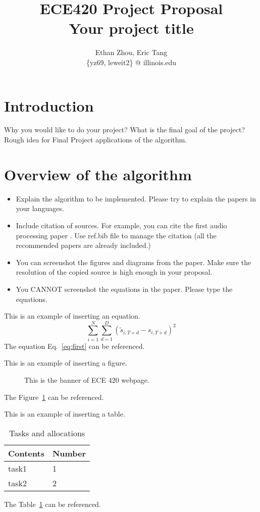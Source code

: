 \documentclass[journal,onecolumn, draftclsnofoot, 12pt]{IEEEtran}
\title{ECE420 Project Proposal\\ Your project title }
\author{Ethan Zhou, Eric Tang \\
\{yz69, leweit2\} @ illinois.edu}
\begin{document}
\maketitle
\section{Introduction}
Why you would like to do your project? What is the final goal of the project? Rough idea for Final Project applications of the algorithm.

\section{Overview of the algorithm}
\begin{itemize}
    \item Explain the algorithm to be implemented. Please try to explain the papers in your languages.
    \item Include citation of sources. For example, you can cite the first audio processing paper \cite{wang2003industrial}. Use ref.bib file to manage the citation (all the recommended papers are already included.)  
    \item You can screenshot the figures and diagrams from the paper. Make sure the resolution of the copied source is high enough in your proposal.
    \item You CANNOT screenshot the equations in the paper. Please type the equations. 
\end{itemize}


This is an example of inserting an equation. 
\begin{equation} \label{eq:first}
    \sum_{i=1}^N  \sum_{d=1}^D (\widetilde{s}_{i, T+d} - {s}_{i, T+d})^2
\end{equation}
The equation Eq.~\ref{eq:first} can be referenced. 


This is an example of inserting a figure. 
\begin{figure}[h]
\begin{center}
\caption{ This is the banner of ECE 420 webpage.  } 
\label{fig:banner}
\end{center}
\end{figure}
The Figure~\ref{fig:banner} can be referenced. 


This is an example of inserting a table.
\begin{table}[h]
\small
    \centering
    \begin{tabular}{|p{1.5in}|p{1.5in}|}
        \hline
        \textbf{Contents} & \textbf{Number} \\
         \hline
        task1 &  1\\
        \hline
        task2 &  2 \\
         \hline
         
    \end{tabular}
    \vspace{0.1in}
    \caption{Tasks and allocations}
    \label{tab:table}
\end{table}
The Table~\ref{tab:table} can be referenced. 
\end{document}
